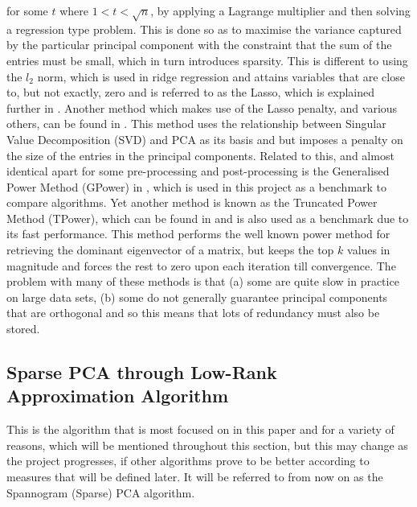 \documentclass[11pt,a4paper]{article}
\begin{document}
for some $t$ where $1<t<\sqrt{n}$, by applying a Lagrange multiplier and then solving a regression type problem. This is done so as to maximise the variance captured by the particular principal component with the constraint that the sum of the entries must be small, which in turn introduces sparsity. This is different to using the $l_2$ norm, which is used in ridge regression and attains variables that are close to, but not exactly, zero and is referred to as the Lasso, which is explained further in \cite{lasso}. Another method which makes use of the Lasso penalty, and various others, can be found in \cite{shen}. This method uses the relationship between Singular Value Decomposition (SVD) and PCA as its basis and but imposes a penalty on the size of the entries in the principal components. Related to this, and almost identical apart for some pre-processing and post-processing is the Generalised Power Method (GPower) in \cite{GPower}, which is used in this project as a benchmark to compare algorithms. Yet another method is known as the Truncated Power Method (TPower), which can be found in \cite{truncpower} and is also used as a benchmark due to its fast performance. This method performs the well known power method for retrieving the dominant eigenvector of a matrix, but keeps the top $k$ values in magnitude and forces the rest to zero upon each iteration till convergence. The problem with many of these methods is that (a) some are quite slow in practice on large data sets, (b) some do not generally guarantee principal components that are orthogonal and so this means that lots of redundancy must also be stored. 

\subsection{Sparse PCA through Low-Rank Approximation Algorithm}
This is the algorithm\cite{dimakis} that is most focused on in this paper and for a variety of reasons, which will be mentioned throughout this section, but this may change as the project progresses, if other algorithms prove to be better according to measures that will be defined later. It will be referred to from now on as the Spannogram (Sparse) PCA  algorithm.
\end{document}
